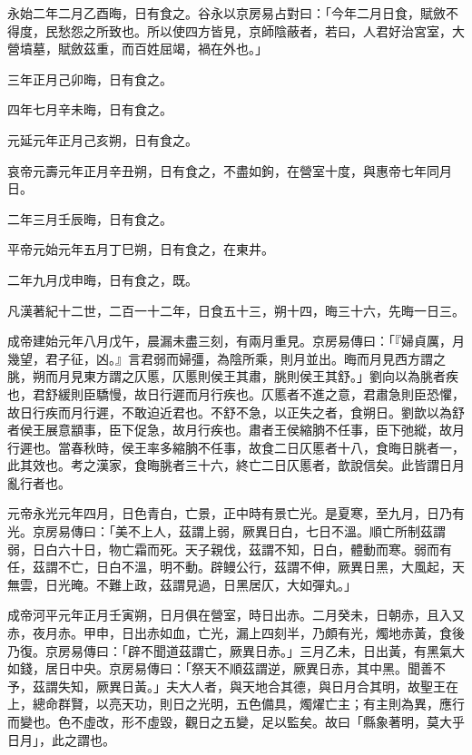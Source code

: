 \begin{pinyinscope}
永始二年二月乙酉晦，日有食之。谷永以京房易占對曰：「今年二月日食，賦斂不得度，民愁怨之所致也。所以使四方皆見，京師陰蔽者，若曰，人君好治宮室，大營墳墓，賦斂茲重，而百姓屈竭，禍在外也。」

三年正月己卯晦，日有食之。

四年七月辛未晦，日有食之。

元延元年正月己亥朔，日有食之。

哀帝元壽元年正月辛丑朔，日有食之，不盡如鉤，在營室十度，與惠帝七年同月日。

二年三月壬辰晦，日有食之。

平帝元始元年五月丁巳朔，日有食之，在東井。

二年九月戊申晦，日有食之，既。

凡漢著紀十二世，二百一十二年，日食五十三，朔十四，晦三十六，先晦一日三。

成帝建始元年八月戊午，晨漏未盡三刻，有兩月重見。京房易傳曰：「『婦貞厲，月幾望，君子征，凶。』言君弱而婦彊，為陰所乘，則月並出。晦而月見西方謂之朓，朔而月見東方謂之仄慝，仄慝則侯王其肅，朓則侯王其舒。」劉向以為朓者疾也，君舒緩則臣驕慢，故日行遲而月行疾也。仄慝者不進之意，君肅急則臣恐懼，故日行疾而月行遲，不敢迫近君也。不舒不急，以正失之者，食朔日。劉歆以為舒者侯王展意顓事，臣下促急，故月行疾也。肅者王侯縮朒不任事，臣下弛縱，故月行遲也。當春秋時，侯王率多縮朒不任事，故食二日仄慝者十八，食晦日朓者一，此其效也。考之漢家，食晦朓者三十六，終亡二日仄慝者，歆說信矣。此皆謂日月亂行者也。

元帝永光元年四月，日色青白，亡景，正中時有景亡光。是夏寒，至九月，日乃有光。京房易傳曰：「美不上人，茲謂上弱，厥異日白，七日不溫。順亡所制茲謂弱，日白六十日，物亡霜而死。天子親伐，茲謂不知，日白，體動而寒。弱而有任，茲謂不亡，日白不溫，明不動。辟鳗公行，茲謂不伸，厥異日黑，大風起，天無雲，日光晻。不難上政，茲謂見過，日黑居仄，大如彈丸。」

成帝河平元年正月壬寅朔，日月俱在營室，時日出赤。二月癸未，日朝赤，且入又赤，夜月赤。甲申，日出赤如血，亡光，漏上四刻半，乃頗有光，燭地赤黃，食後乃復。京房易傳曰：「辟不聞道茲謂亡，厥異日赤。」三月乙未，日出黃，有黑氣大如錢，居日中央。京房易傳曰：「祭天不順茲謂逆，厥異日赤，其中黑。聞善不予，茲謂失知，厥異日黃。」夫大人者，與天地合其德，與日月合其明，故聖王在上，總命群賢，以亮天功，則日之光明，五色備具，燭燿亡主；有主則為異，應行而變也。色不虛改，形不虛毀，觀日之五變，足以監矣。故曰「縣象著明，莫大乎日月」，此之謂也。


\end{pinyinscope}
